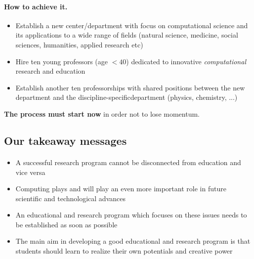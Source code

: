 \documentclass[%
<<<<<<< HEAD
oneside,                 %
final,                   %
=======
twoside,                 %
final,                   %
>>>>>>> 5fc06d357468ca5ec59d2d3ed0179709275f8f00
10pt]{article}
\begin{document}
\begin{itemize}
\begin{itemize}
\paragraph{How to achieve it.}
\begin{itemize}
\item Establish  a new center/department with focus on computational science and its applications to a wide range of fields (natural science, medicine, social sciences, humanities, applied research etc)

\item Hire ten young professors (age $< 40$) dedicated to innovative \emph{computational} research and education

\item Establish another ten professorships with  shared positions between the  new department and the discipline-specificdepartment (physics, chemistry, ...)
\end{itemize}

\noindent



\textbf{The process must start now} in order not to lose momentum.


\subsection*{Our takeaway messages}

\paragraph{}
\begin{itemize}
\item A successful research program cannot be disconnected from education and vice versa

\item Computing plays and will play an even more important role in future scientific and technological advances

\item An educational and research program which focuses on these issues needs to be established as soon as possible

\item The main aim in developing a good educational and research program is  that students should learn to realize their own potentials and creative power
\end{itemize}


\end{itemize}
\end{itemize}
\end{document}
